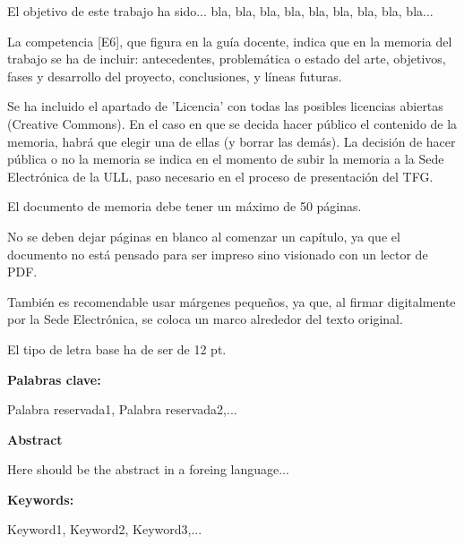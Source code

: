 \documentclass[a4paper,12pt,oneside]{scrbook}
\newenvironment{abstract}[1][\abstractname]{
    \cleardoublepageusingstyle{empty}
    \thispagestyle{empty}
    \begin{center}\textbf{#1}\end{center}
    \begin{itshape}\par\noindent%
}
{\end{itshape}}
\newenvironment{keywords}[1][Keywords]
{\vspace{7pt}\par\noindent\textup{\textbf{#1: }}\begin{upshape}}
{\end{upshape}}
\begin{document}
\begin{abstract}
El objetivo de este trabajo ha sido... bla, bla, bla, bla, bla, bla, bla, bla, bla...

La competencia [E6], que figura en la guía docente, indica que en la memoria del trabajo se ha de incluir: antecedentes, problemática o estado del arte, objetivos, fases y desarrollo del proyecto, conclusiones, y líneas futuras.

Se ha incluido el apartado de 'Licencia' con todas las posibles licencias abiertas (Creative Commons). En el caso en que se decida hacer público el contenido de la memoria, habrá que elegir una de ellas (y borrar las demás). La decisión de hacer pública o no la memoria se indica en el momento de subir la memoria a la Sede Electrónica de la ULL, paso necesario en el proceso de presentación del TFG.

El documento de memoria debe tener un máximo de 50 páginas.

No se deben dejar páginas en blanco al comenzar un capítulo, ya que el documento no está pensado para ser impreso sino visionado con un lector de PDF.

También es recomendable usar márgenes pequeños, ya que, al firmar digitalmente por la Sede Electrónica, se coloca un marco alrededor del texto original.

El tipo de letra base ha de ser de 12 pt.

\begin{keywords}[Palabras clave]
Palabra reservada1, Palabra reservada2,...
\end{keywords}
\end{abstract}

\thispagestyle{empty}

\begin{abstract}[Abstract]
Here should be the abstract in a foreing language...

\begin {keywords}
Keyword1, Keyword2, Keyword3,...
\end{keywords}
\end{abstract}

\pagestyle{plain}
\cleardoublepage
\setcounter{page}{1} 

\tableofcontents
\listoffigures
\listoftables
\end{document}
